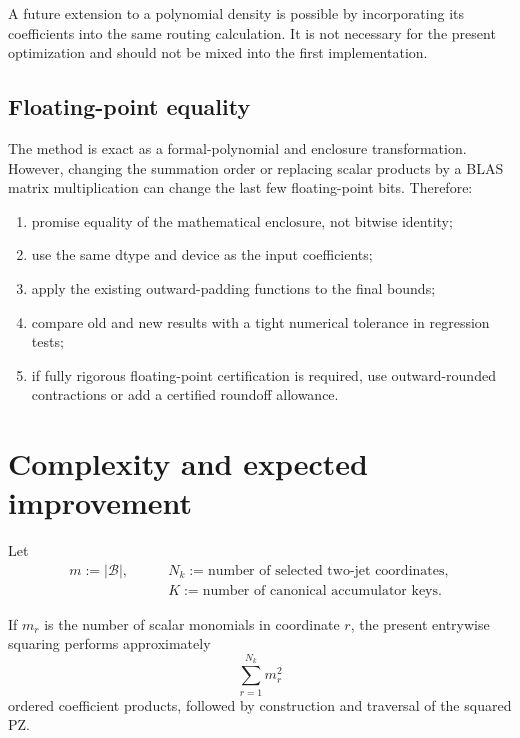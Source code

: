 \documentclass[11pt]{article}
\newcommand{\abs}[1]{\left\lvert #1\right\rvert}
\begin{document}
A future extension to a polynomial density is possible by incorporating its
coefficients into the same routing calculation.  It is not necessary for the
present optimization and should not be mixed into the first implementation.

\subsection{Floating-point equality}

The method is exact as a formal-polynomial and enclosure transformation.
However, changing the summation order or replacing scalar products by a BLAS
matrix multiplication can change the last few floating-point bits.  Therefore:
\begin{enumerate}[label=\arabic*.]
    \item promise equality of the mathematical enclosure, not bitwise identity;
    \item use the same dtype and device as the input coefficients;
    \item apply the existing outward-padding functions to the final bounds;
    \item compare old and new results with a tight numerical tolerance in
    regression tests;
    \item if fully rigorous floating-point certification is required, use
    outward-rounded contractions or add a certified roundoff allowance.
\end{enumerate}

\section{Complexity and expected improvement}

Let
\begin{align*}
    m:=\abs{\mathcal{B}},
    \qquad&
    N_k:=\text{number of selected two-jet coordinates},\\
    &
    K:=\text{number of canonical accumulator keys}.
\end{align*}

If \(m_r\) is the number of scalar monomials in coordinate \(r\), the present
entrywise squaring performs approximately
\[
    \sum_{r=1}^{N_k}m_r^2
\]
ordered coefficient products, followed by construction and traversal of the
squared PZ.
\end{document}
